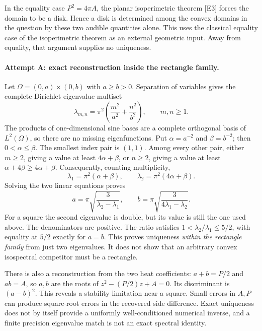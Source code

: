 \documentclass[11pt]{article}
\begin{document}
In the equality case $P^2=4\pi A$, the planar isoperimetric theorem [E3] forces
the domain to be a disk. Hence a disk is determined among the convex
domains in the question by these two audible quantities alone. This uses
the classical equality case of the isoperimetric theorem as an external
geometric input. Away from equality, that argument supplies no uniqueness.

\paragraph{Attempt A: exact reconstruction inside the rectangle family.}
Let $\Omega=(0,a)\times(0,b)$ with $a\ge b>0$. Separation of variables
gives the complete Dirichlet eigenvalue multiset
\begin{equation}\label{a492:rectangle}
 \lambda_{m,n}=\pi^2\left(\frac{m^2}{a^2}+\frac{n^2}{b^2}\right),
                         \qquad m,n\ge1.
\end{equation}
The products of one-dimensional sine bases are a complete orthogonal basis
of $L^2(\Omega)$, so there are no missing eigenfunctions. Put
$\alpha=a^{-2}$ and $\beta=b^{-2}$; then $0<\alpha\le\beta$.
The smallest index pair is $(1,1)$. Among every other pair, either
$m\ge2$, giving a value at least $4\alpha+\beta$, or $n\ge2$,
giving a value at least $\alpha+4\beta\ge4\alpha+\beta$.
Consequently, counting multiplicity,
\[
 \lambda_1=\pi^2(\alpha+\beta),\qquad
 \lambda_2=\pi^2(4\alpha+\beta).
\]
Solving the two linear equations proves
\begin{equation}\label{a492:inverse}
 a=\pi\sqrt{\frac{3}{\lambda_2-\lambda_1}},\qquad
 b=\pi\sqrt{\frac{3}{4\lambda_1-\lambda_2}}.
\end{equation}
For a square the second eigenvalue is double, but its value is still the
one used above. The denominators are positive. The ratio satisfies
$1<\lambda_2/\lambda_1\le5/2$, with equality at $5/2$ exactly for
$a=b$. This proves uniqueness \emph{within the rectangle family} from
just two eigenvalues. It does not show that an arbitrary convex isospectral
competitor must be a rectangle.

There is also a reconstruction from the two heat coefficients: $a+b=P/2$
and $ab=A$, so $a,b$ are the roots of
$z^2-(P/2)z+A=0$. Its discriminant is $(a-b)^2$.
This reveals a stability limitation near a square. Small errors in $A,P$
can produce square-root errors in the recovered side difference. Exact
uniqueness does not by itself provide a uniformly well-conditioned numerical
inverse, and a finite precision eigenvalue match is not an exact spectral
identity.
\end{document}
